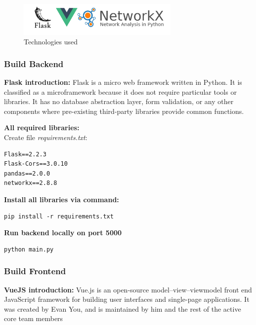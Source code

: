 \begin{figure}[H]
    \centering
    \includegraphics[width=0.7\textwidth]{image/technology.png}
    \caption{Technologies used}
\end{figure}

\subsubsection{Build Backend}
\textbf{Flask introduction:} Flask is a micro web framework written in Python. It is classified as a microframework because it does not require particular tools or libraries. It has no database abstraction layer, form validation, or any other components where pre-existing third-party libraries provide common functions.

\textbf{All required libraries:} \\
Create file \textit{requirements.txt}:
\begin{lstlisting}
Flask==2.2.3
Flask-Cors==3.0.10
pandas==2.0.0
networkx==2.8.8
\end{lstlisting}

\textbf{Install all libraries via command:}
\begin{lstlisting}
pip install -r requirements.txt
\end{lstlisting}

\textbf{Run backend locally on port 5000}
\begin{lstlisting}
python main.py
\end{lstlisting}
\subsubsection{Build Frontend}
\textbf{VueJS introduction:} Vue.js is an open-source model–view–viewmodel front end JavaScript framework for building user interfaces and single-page applications. It was created by Evan You, and is maintained by him and the rest of the active core team members



